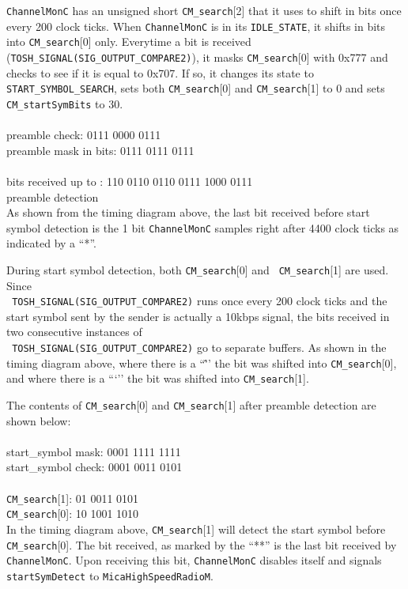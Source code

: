 \documentclass[11pt]{article}
\begin{document}
\normalsize
{\tt ChannelMonC} has an unsigned short {\tt CM\_search}[2] that it uses to shift
in bits once every 200 clock ticks. When {\tt ChannelMonC} is
in its {\tt IDLE\_STATE}, it shifts in bits into {\tt CM\_search}[0] only. Everytime a
bit is received ({\tt TOSH\_SIGNAL(SIG\_OUTPUT\_COMPARE2)}), it masks {\tt CM\_search}[0]
with 0x777 and checks to see if it is equal to 0x707. If so, it
changes its state to {\tt START\_SYMBOL\_SEARCH}, sets both {\tt CM\_search}[0] and
{\tt CM\_search}[1] to 0 and sets {\tt CM\_startSymBits} to 30. 
\\
\\preamble check:                               0111 0000 0111
\\preamble mask in bits:                        0111 0111 0111
\\
\\bits received up to :           110 0110 0110 0111 1000 0111
\\preamble detection
\\
As shown from the timing diagram above, the last bit received before
start symbol detection is the 1 bit {\tt ChannelMonC} samples right after
4400 clock ticks as indicated by a ``*''.

During start symbol detection, both {\tt CM\_search}[0] and {\tt
CM\_search}[1] are used. Since \\ {\tt
TOSH\_SIGNAL(SIG\_OUTPUT\_COMPARE2)} runs once every 200 clock ticks
and the start symbol sent by the sender is actually a 10kbps signal,
the bits received in two consecutive instances of \\ {\tt
TOSH\_SIGNAL(SIG\_OUTPUT\_COMPARE2)} go to separate buffers.  As shown
in the timing diagram above, where there is a ``\^'' the bit was
shifted into {\tt CM\_search}[0], and where there is a ```'' the bit
was shifted into {\tt CM\_search}[1].

The contents of {\tt CM\_search}[0] and {\tt CM\_search}[1] after preamble detection
are shown below:
\\
\\start\_symbol mask:                           0001 1111 1111
\\start\_symbol check:                          0001 0011 0101
\\
\\{\tt CM\_search}[1]:                            01 0011 0101 
\\{\tt CM\_search}[0]:                            10 1001 1010 
\\
In the timing diagram above, {\tt CM\_search}[1] will detect the start symbol before
{\tt CM\_search}[0]. The bit received, as marked by the ``**'' is the last
bit received by {\tt ChannelMonC}. Upon receiving this bit, {\tt ChannelMonC}
disables itself and signals {\tt startSymDetect} to {\tt MicaHighSpeedRadioM}.
\end{document}
